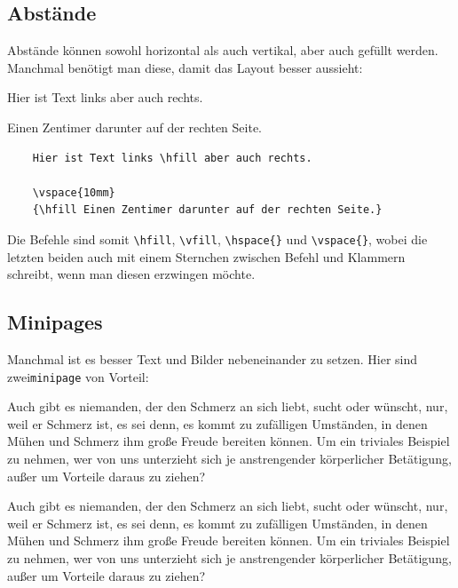 \subsection{Abstände}

Abstände können sowohl horizontal als auch vertikal, aber auch gefüllt werden. Manchmal benötigt man diese, damit das Layout besser aussieht:

Hier ist Text links \hfill aber auch rechts.

\vspace{10mm}
{\hfill Einen Zentimer darunter auf der rechten Seite.}

\begin{verbatim}
    Hier ist Text links \hfill aber auch rechts.

    \vspace{10mm}
    {\hfill Einen Zentimer darunter auf der rechten Seite.}
\end{verbatim}

Die Befehle sind somit \verb|\hfill|, \verb|\vfill|, \verb|\hspace{}| und \verb|\vspace{}|, wobei die letzten beiden auch mit einem Sternchen zwischen Befehl und Klammern schreibt, wenn man diesen erzwingen möchte.

\subsection{Minipages}

Manchmal ist es besser Text und Bilder nebeneinander zu setzen. Hier sind zwei\linebreak \verb|minipage| von Vorteil:\\

\begin{minipage}[H]{0.48\textwidth}
	Auch gibt es niemanden, der den Schmerz an sich liebt, sucht oder wünscht, nur, weil er Schmerz ist, es sei denn, es kommt zu zufälligen Umständen, in denen Mühen und Schmerz ihm große Freude bereiten können. Um ein triviales Beispiel zu nehmen, wer von uns unterzieht sich je anstrengender körperlicher Betätigung, außer um Vorteile daraus zu ziehen?
\end{minipage}
\hfill
\begin{minipage}[H]{0.48\textwidth}
	Auch gibt es niemanden, der den Schmerz an sich liebt, sucht oder wünscht, nur, weil er Schmerz ist, es sei denn, es kommt zu zufälligen Umständen, in denen Mühen und Schmerz ihm große Freude bereiten können. Um ein triviales Beispiel zu nehmen, wer von uns unterzieht sich je anstrengender körperlicher Betätigung, außer um Vorteile daraus zu ziehen?
\end{minipage}\\

